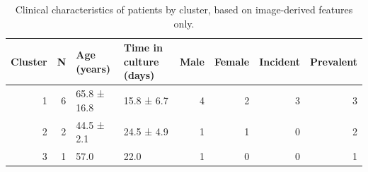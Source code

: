 \begin{table}[htbp]
    \centering
    \caption{Clinical characteristics of patients by cluster, based on image-derived features only.}
    \label{tab:cluster_clinical_basic}
\begin{tabular}{rrllrrrr}
\toprule
Cluster & N & Age (years) & Time in culture (days) & Male & Female & Incident & Prevalent \\
\midrule
1 & 6 & 65.8 ± 16.8 & 15.8 ± 6.7 & 4 & 2 & 3 & 3 \\
2 & 2 & 44.5 ± 2.1 & 24.5 ± 4.9 & 1 & 1 & 0 & 2 \\
3 & 1 & 57.0 & 22.0 & 1 & 0 & 0 & 1 \\
\bottomrule
\end{tabular}

\end{table}
